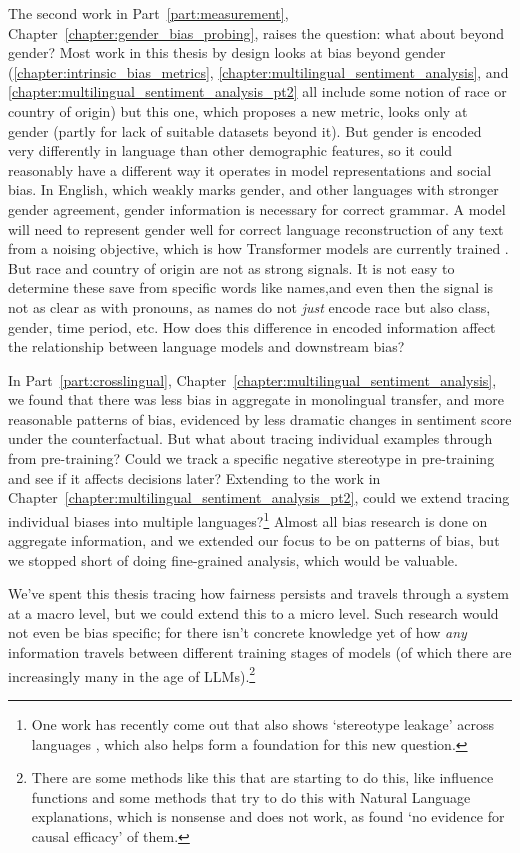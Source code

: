 The second work in Part~\ref{part:measurement}, Chapter~\ref{chapter:gender_bias_probing}, raises the question: what about beyond gender? Most work in this thesis by design looks at bias beyond gender (\ref{chapter:intrinsic_bias_metrics}, \ref{chapter:multilingual_sentiment_analysis}, and \ref{chapter:multilingual_sentiment_analysis_pt2} all include some notion of race or country of origin) but this one,  which proposes a new metric, looks only at gender (partly for lack of suitable datasets beyond it). But gender is encoded very differently in language than other demographic features, so it could reasonably have a different way it operates in model representations and social bias. In English, which weakly marks gender, and other languages with stronger gender agreement, gender information is necessary for correct grammar. A model will need to represent gender well for correct language reconstruction of any text from a noising objective, which is how Transformer models are currently trained  \citep{liu2019roberta, lewis-etal-2020-bart, vaswani}. But race and country of origin are not as strong signals. It is not easy to determine these save from specific words like names,and even then the signal is not as clear as with pronouns, as names do not \textit{just} encode race but also class, gender, time period, etc. How does this difference in encoded information affect the relationship between language models and downstream bias?

In Part~\ref{part:crosslingual}, Chapter~\ref{chapter:multilingual_sentiment_analysis}, we found that there was less bias in aggregate in monolingual transfer, and more reasonable patterns of bias, evidenced by less dramatic changes in sentiment score under the counterfactual. But what about tracing individual examples through from pre-training? Could we track a specific negative stereotype in pre-training and see if it affects decisions later? Extending to the work in Chapter~\ref{chapter:multilingual_sentiment_analysis_pt2}, could we extend tracing individual biases into multiple languages?\footnote{One work has recently come out that also shows `stereotype leakage' across languages \citep{cao2023multilingual}, which also helps form a foundation for this new question.} Almost all bias research is done on aggregate information, and we extended our focus to be on patterns of bias, but we stopped short of doing fine-grained analysis, which would be valuable. 

We've spent this thesis tracing how fairness persists and travels through a system at a macro level, but we could extend this to a micro level. Such research would not even be bias specific; for there isn't concrete knowledge yet of how \textit{any} information travels between different training stages of models (of which there are increasingly many in the age of LLMs).\footnote{There are some methods like this that are starting to do this, like influence functions \citep{grosse2023studying} and some methods that try to do this with Natural Language explanations, which is nonsense and does not work, as \citet{huang-etal-2023-rigorously} found `no evidence for causal efficacy' of them.}

